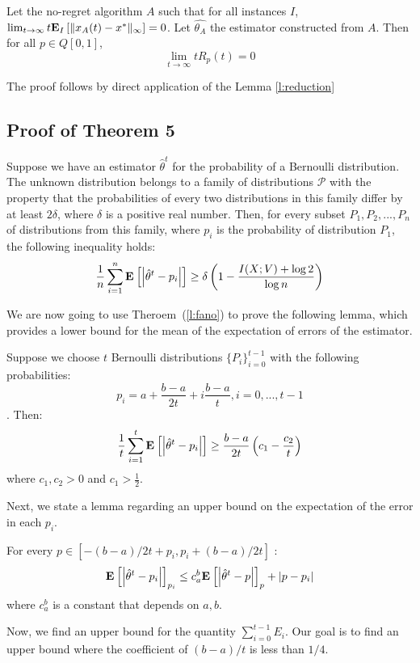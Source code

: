 \begin{theorem}
Let the no-regret algorithm $A$ such that for all instances $I$, $\lim_{t \rightarrow \infty} t \bm{\mathrm{E}}_{I} \left[ \| x_A(t)-x^* \|_{\infty} \right]=0$.
Let $\hat{\theta_A}$ the estimator constructed from $A$. Then for all  $p \in Q[0,1]$, \[\lim_{t \rightarrow \infty}tR_p(t)=0\]
\end{theorem}
The proof follows by direct application of the Lemma \ref{l:reduction}

\subsection{Proof of Theorem 5}

\begin{lemma}\label{l:fano}
Suppose we have an estimator $\hat{\theta}^t$ for the probability of a Bernoulli distribution. 
The unknown distribution belongs to a family of distributions $\mathcal{P}$ with the property that the probabilities of every two distributions in this family differ by at least $2\delta$, where $\delta$ is a positive real number.
Then, for every subset ${P_1, P_2, ..., P_n}$ of distributions from this family, where $p_i$ is the probability of distribution $P_1$, the following inequality holds:
$$\frac{1}{n} \sum_{i=1}^n \Exp{\lp|\hat{\theta}^t-p_i\rp|} \geq \delta \lp(1-\frac{I(X;V)+\log 2}{\log n}\rp)$$
\end{lemma}

We are now going to use Theroem~(\ref{l:fano}) to prove the following lemma, which provides a lower bound for the mean of the expectation of errors of the estimator.
\begin{lemma}\label{l:fano_application}
Suppose we choose $t$ Bernoulli distributions $\{P_i\}_{i=0}^{t-1}$ with the following probabilities: $$p_i = a+\frac{b-a}{2t} + i \frac{b-a}{t} , i=0, ..., t-1$$. Then:
$$\frac{1}{t} \sum_{i=1}^t \Exp{\lp|\hat{\theta}^t-p_i\rp|} \geq \frac{b-a}{2t} \lp(c_1 - \frac{c_2}{t}\rp)$$
where $c_1, c_2 >0$ and $c_1 > \frac{1}{2}$.
\end{lemma}

Next, we state a lemma regarding an upper bound on the expectation of the error in each $p_i$.
\begin{lemma}\label{l:cauchy_schwarz}
For every $p\in [-(b-a)/{2t} + p_i , p_i + (b-a)/{2t}]$ :
$$\Exp{\lp|\hat{\theta}^t-p_i\rp|}_{p_i} \leq c_a^b\Exp{\lp|\hat{\theta}^t-p\rp|}_p + \lp|p - p_i\rp|
$$
where $c_a^b$ is a constant that depends on $a,b$.
 
\end{lemma}
Now, we find an upper bound for the quantity $\sum_{i=0}^{t-1} E_i$.
Our goal is to find an upper bound where the coefficient of $(b-a)/t$ is less than $1/4$.

